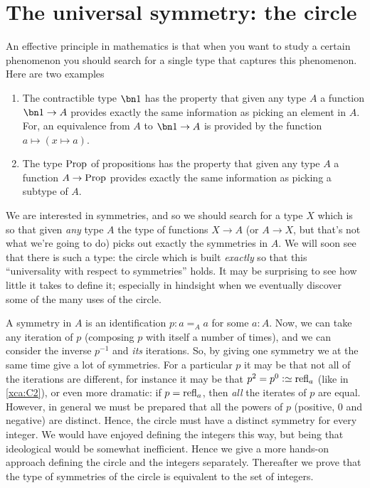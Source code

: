 \chapter{The universal symmetry: the circle}
\label{cha:circle}

An effective principle in mathematics is that when you want to study a certain 
phenomenon you should search for a single type that captures this phenomenon.  
Here are two examples
\begin{enumerate}
\item The contractible type $\bn 1$ has the property that given 
any type $A$ a function $\bn 1\to A$ provides exactly the 
same information as picking an element in $A$.
For, an equivalence from $A$ to $\bn 1\to A$ is provided by
the function $a \mapsto (x \mapsto a)$.
\item The type $\mathrm{Prop}$ of propositions has the property that 
given any type $A$ a function $A\to\mathrm{Prop}$ provides exactly 
the same information as picking a subtype of $A$.
\end{enumerate}
We are interested in symmetries, and so we should search for a type $X$ 
which is so that given \emph{any} type $A$ the type of functions 
$X\to A$ (or $A\to X$, but that's not what we're going to do) 
picks out exactly the symmetries in $A$.  
We will soon see that there is such a type: 
the circle which is built \emph{exactly} so that this 
``universality with respect to symmetries'' holds.  
It may be surprising to see how little it takes to define it; 
especially in hindsight when we eventually discover some of the many uses of the circle.

A symmetry in $A$ is an identification $p:a=_Aa$ for some $a:A$.  
Now, we can take any iteration of $p$ (composing $p$ with itself a number of times), 
and we can consider the inverse $p^{-1}$ and \emph{its} iterations.  
So, by giving one symmetry we at the same time give a lot of symmetries.  
For a particular $p$ it may be that not all of the iterations are different, 
for instance it may be that $p^2=p^0\defequi\refl a$ (like in \cref{xca:C2}), 
or even more dramatic: if  $p=\refl a$, then \emph{all} the iterates of $p$ are equal. 
However, in general we must be prepared that all the powers of $p$ 
(positive, $0$ and negative) are distinct. 
Hence, the circle must have a distinct symmetry for every integer. 
We would have enjoyed defining the integers this way, 
but being that ideological would be somewhat inefficient. 
Hence we give a more hands-on approach defining the circle 
and the integers separately. Thereafter we prove that the type of 
symmetries of the circle is equivalent to the set of integers. 

